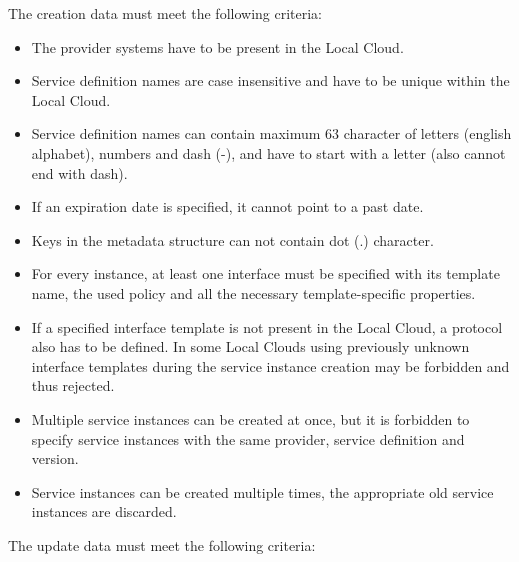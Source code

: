\documentclass[a4paper]{arrowhead}
\begin{document}

The creation data must meet the following criteria:

\begin{itemize}
    \item The provider systems have to be present in the Local Cloud.
    \item Service definition names are case insensitive and have to be unique within the Local Cloud.
    \item Service definition names can contain maximum 63 character of letters (english alphabet), numbers and dash (-), and have to start with a letter (also cannot end with dash).
    \item If an expiration date is specified, it cannot point to a past date.
    \item Keys in the metadata structure can not contain dot (.) character.
    \item For every instance, at least one interface must be specified with its template name, the used policy and all the necessary template-specific properties.
    \item If a specified interface template is not present in the Local Cloud, a protocol also has to be defined. In some Local Clouds using previously unknown interface templates during the service instance creation may be forbidden and thus rejected.
    \item Multiple service instances can be created at once, but it is forbidden to specify service instances with the same provider, service definition and version.
    \item Service instances can be created multiple times, the appropriate old service instances are discarded.
\end{itemize}


The update data must meet the following criteria:
\end{document}

